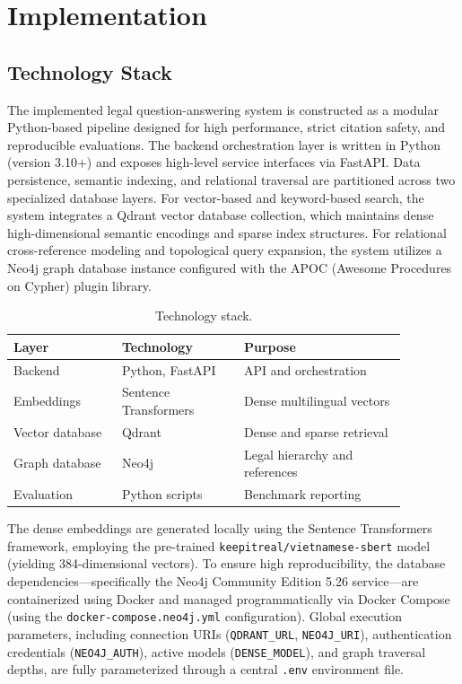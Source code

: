 \chapter{Implementation}
\label{ch:implementation}

\section{Technology Stack}
The implemented legal question-answering system is constructed as a modular Python-based pipeline designed for high performance, strict citation safety, and reproducible evaluations. The backend orchestration layer is written in Python (version 3.10+) and exposes high-level service interfaces via FastAPI. Data persistence, semantic indexing, and relational traversal are partitioned across two specialized database layers. For vector-based and keyword-based search, the system integrates a Qdrant vector database collection, which maintains dense high-dimensional semantic encodings and sparse index structures. For relational cross-reference modeling and topological query expansion, the system utilizes a Neo4j graph database instance configured with the APOC (Awesome Procedures on Cypher) plugin library.

\begin{table}[H]
  \centering
  \caption{Technology stack.}
  \label{tab:technology-stack}
  \begin{tabular}{p{0.24\linewidth}p{0.27\linewidth}p{0.36\linewidth}}
    \toprule
    Layer & Technology & Purpose \\
    \midrule
    Backend & Python, FastAPI & API and orchestration \\
    Embeddings & Sentence Transformers & Dense multilingual vectors \\
    Vector database & Qdrant & Dense and sparse retrieval \\
    Graph database & Neo4j & Legal hierarchy and references \\
    Evaluation & Python scripts & Benchmark reporting \\
    \bottomrule
  \end{tabular}
\end{table}

The dense embeddings are generated locally using the Sentence Transformers framework, employing the pre-trained \texttt{keepitreal/\allowbreak{}vietnamese-sbert} model (yielding 384-dimensional vectors). To ensure high reproducibility, the database dependencies—specifically the Neo4j Community Edition 5.26 service—are containerized using Docker and managed programmatically via Docker Compose (using the \texttt{docker-compose.\allowbreak{}neo4j.yml} configuration). Global execution parameters, including connection URIs (\texttt{QDRANT\_URL}, \texttt{NEO4J\_URI}), authentication credentials (\texttt{NEO4J\_AUTH}), active models (\texttt{DENSE\_MODEL}), and graph traversal depths, are fully parameterized through a central \texttt{.env} environment file.

